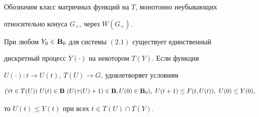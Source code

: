 Обозначим класс матричных функций на $T$, монотонно неубывающих


относительно конуса $G_+$, через $W(G_+)$.





\begin{thm}


При любом $Y_0\in\bold B_0$ для системы $(2.1)$ существует единственный


дискретный процесс $Y(\cdot)$ на некотором $T(Y)$. Если функция


$U(\cdot):t\to U(t)$, $T(U)\to G$, удовлетворяет условиям


\begin{equation}


(\forall t\in T(U))\ U(t)\in\bold B\ (U(\tau(U)+1)


\in\bold B, U(0)\in \bold B_0),


\ U(t+1)\le F(t,U(t)),\ U(0)\le Y(0),


\end{equation}


то $U(t)\le Y(t)$ при всех $t\in T(U)\cap T(Y)$.


\end{thm}





